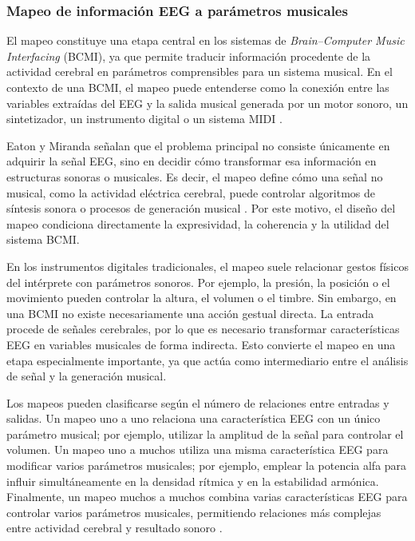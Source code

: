 \documentclass[../main.tex]{subfiles}
\begin{document}
\subsubsection{Mapeo de información EEG a parámetros musicales}

El mapeo constituye una etapa central en los sistemas de \textit{Brain--Computer Music Interfacing} (BCMI), ya que permite traducir información procedente de la actividad cerebral en parámetros comprensibles para un sistema musical. En el contexto de una BCMI, el mapeo puede entenderse como la conexión entre las variables extraídas del EEG y la salida musical generada por un motor sonoro, un sintetizador, un instrumento digital o un sistema MIDI \cite{EatonMiranda2014Mapping}.

Eaton y Miranda señalan que el problema principal no consiste únicamente en adquirir la señal EEG, sino en decidir cómo transformar esa información en estructuras sonoras o musicales. Es decir, el mapeo define cómo una señal no musical, como la actividad eléctrica cerebral, puede controlar algoritmos de síntesis sonora o procesos de generación musical \cite{EatonMiranda2014Mapping}. Por este motivo, el diseño del mapeo condiciona directamente la expresividad, la coherencia y la utilidad del sistema BCMI.

En los instrumentos digitales tradicionales, el mapeo suele relacionar gestos físicos del intérprete con parámetros sonoros. Por ejemplo, la presión, la posición o el movimiento pueden controlar la altura, el volumen o el timbre. Sin embargo, en una BCMI no existe necesariamente una acción gestual directa. La entrada procede de señales cerebrales, por lo que es necesario transformar características EEG en variables musicales de forma indirecta. Esto convierte el mapeo en una etapa especialmente importante, ya que actúa como intermediario entre el análisis de señal y la generación musical.

Los mapeos pueden clasificarse según el número de relaciones entre entradas y salidas. Un mapeo uno a uno relaciona una característica EEG con un único parámetro musical; por ejemplo, utilizar la amplitud de la señal para controlar el volumen. Un mapeo uno a muchos utiliza una misma característica EEG para modificar varios parámetros musicales; por ejemplo, emplear la potencia alfa para influir simultáneamente en la densidad rítmica y en la estabilidad armónica. Finalmente, un mapeo muchos a muchos combina varias características EEG para controlar varios parámetros musicales, permitiendo relaciones más complejas entre actividad cerebral y resultado sonoro \cite{EatonMiranda2014Mapping}.
\end{document}
